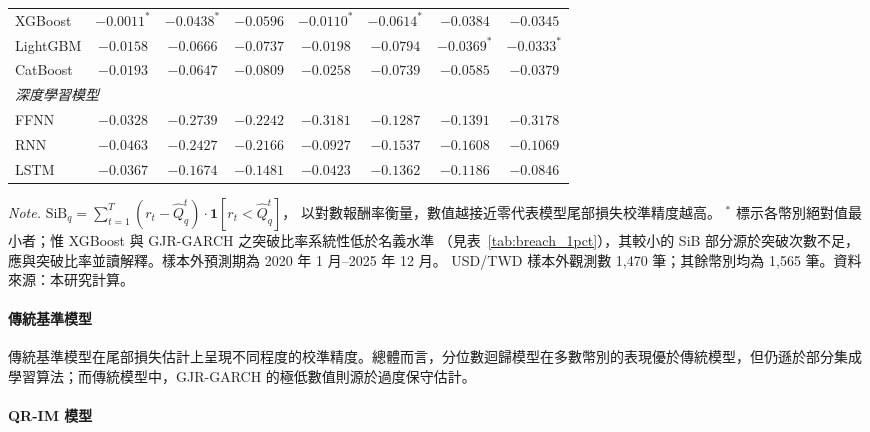 \begin{table}[htbp]
{\begin{tabular}{lccccccc}
        XGBoost         & $-0.0011^{*}$ & $-0.0438^{*}$ & $-0.0596$ & $-0.0110^{*}$ & $-0.0614^{*}$ & $-0.0384$ & $-0.0345$ \\
        LightGBM        & $-0.0158$ & $-0.0666$ & $-0.0737$ & $-0.0198$ & $-0.0794$ & $-0.0369^{*}$ & $-0.0333^{*}$ \\
        CatBoost        & $-0.0193$ & $-0.0647$ & $-0.0809$ & $-0.0258$ & $-0.0739$ & $-0.0585$ & $-0.0379$ \\
        \hline
        \multicolumn{8}{l}{\textit{深度學習模型}} \\
        FFNN            & $-0.0328$ & $-0.2739$ & $-0.2242$ & $-0.3181$ & $-0.1287$ & $-0.1391$ & $-0.3178$ \\
        RNN             & $-0.0463$ & $-0.2427$ & $-0.2166$ & $-0.0927$ & $-0.1537$ & $-0.1608$ & $-0.1069$ \\
        LSTM            & $-0.0367$ & $-0.1674$ & $-0.1481$ & $-0.0423$ & $-0.1362$ & $-0.1186$ & $-0.0846$ \\
        \hline
    \end{tabular}}
 
    \vspace{3mm}
 
    \begin{minipage}{\textwidth}
        \fontsize{9pt}{13pt}\selectfont
        \textit{Note.} $\mathrm{SiB}_{q} = \sum_{t=1}^{T}(r_t - \widehat{Q}_{q}^{t})\cdot\mathbf{1}[r_t < \widehat{Q}_{q}^{t}]$，
        以對數報酬率衡量，數值越接近零代表模型尾部損失校準精度越高。
        $^{*}$ 標示各幣別絕對值最小者；惟 XGBoost 與 GJR-GARCH 之突破比率系統性低於名義水準
        （見表~\ref{tab:breach_1pct}），其較小的 SiB 部分源於突破次數不足，應與突破比率並讀解釋。樣本外預測期為 2020 年 1 月--2025 年 12 月。
        USD/TWD 樣本外觀測數 1{,}470 筆；其餘幣別均為 1{,}565 筆。資料來源：本研究計算。
    \end{minipage}
\end{table}

\paragraph{傳統基準模型}

傳統基準模型在尾部損失估計上呈現不同程度的校準精度。總體而言，分位數迴歸模型在多數幣別的表現優於傳統模型，但仍遜於部分集成學習算法；而傳統模型中，GJR-GARCH 的極低數值則源於過度保守估計。

\paragraph{QR-IM 模型}

